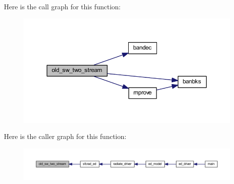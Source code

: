 Here is the call graph for this function\+:\nopagebreak
\begin{figure}[H]
\begin{center}
\leavevmode
\includegraphics[width=350pt]{old__twostream__rad_8f90_ac90aec0e7fa711f6b96d200ae35c737a_cgraph}
\end{center}
\end{figure}




Here is the caller graph for this function\+:\nopagebreak
\begin{figure}[H]
\begin{center}
\leavevmode
\includegraphics[width=350pt]{old__twostream__rad_8f90_ac90aec0e7fa711f6b96d200ae35c737a_icgraph}
\end{center}
\end{figure}


